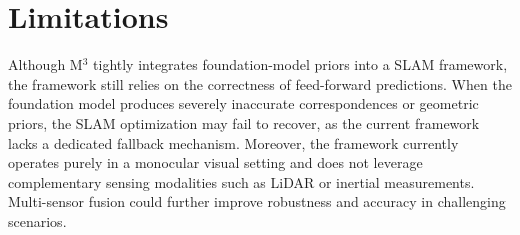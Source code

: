 \section{Limitations}
\label{sec:limitation}
Although M$^3$ tightly integrates foundation-model priors into a SLAM framework, the framework still relies on the correctness of feed-forward predictions. When the foundation model produces severely inaccurate correspondences or geometric priors, the SLAM optimization may fail to recover, as the current framework lacks a dedicated fallback mechanism. Moreover, the framework currently operates purely in a monocular visual setting and does not leverage complementary sensing modalities such as LiDAR or inertial measurements. Multi-sensor fusion could further improve robustness and accuracy in challenging scenarios.